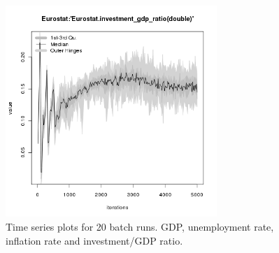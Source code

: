 \begin{figure}[ht!]
\begin{minipage}{17cm}
\includegraphics[width=8cm]{./transient/tax_0.10/Eurostat-investment_gdp_ratio-timebatch.png}
\end{minipage}
\caption{Time series plots for 20 batch runs. GDP, unemployment rate, inflation rate and investment/GDP ratio.}
\label{Figure: transient time}
\end{figure}


